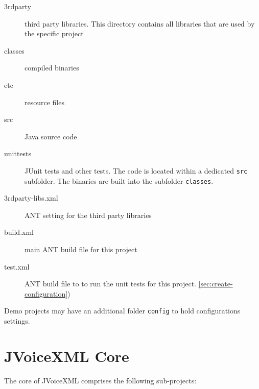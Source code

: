 \documentclass[11pt,a4paper]{article}
\begin{document}
\begin{description}
\item[3rdparty] third party libraries. This directory contains all libraries
that are used by the specific project 
\item[classes] compiled binaries
\item[etc] resource files
\item[src] Java source code
\item[unittests] JUnit tests and other tests. The code is located within a
dedicated \texttt{src} subfolder. The binaries are built into the subfolder
\texttt{classes}.
\item[3rdparty-libs.xml] ANT setting for the third party libraries
\item[build.xml] main ANT build file for this project
\item[test.xml] ANT build file to to run the unit tests for this project.
\ref{sec:create-configuration})
\end{description}

Demo projects may have an additional folder \texttt{config} to hold
configurations settings. 

\section{JVoiceXML Core}

The core of JVoiceXML comprises the following sub-projects:
\end{document}
